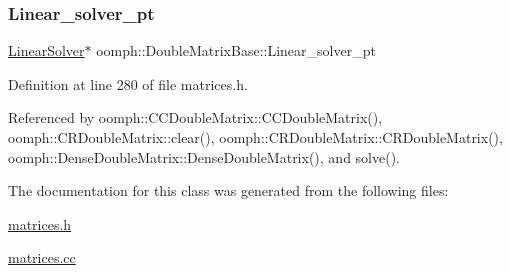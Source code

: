 \mbox{\label{classoomph_1_1DoubleMatrixBase_a86f0315e581cd5b41b75867383aa3760}} 
\subsubsection{\texorpdfstring{Linear\+\_\+solver\+\_\+pt}{Linear\_solver\_pt}}
{\footnotesize\ttfamily \hyperlink{classoomph_1_1LinearSolver}{Linear\+Solver}$\ast$ oomph\+::\+Double\+Matrix\+Base\+::\+Linear\+\_\+solver\+\_\+pt\hspace{0.3cm}{\ttfamily [protected]}}



Definition at line 280 of file matrices.\+h.



Referenced by oomph\+::\+C\+C\+Double\+Matrix\+::\+C\+C\+Double\+Matrix(), oomph\+::\+C\+R\+Double\+Matrix\+::clear(), oomph\+::\+C\+R\+Double\+Matrix\+::\+C\+R\+Double\+Matrix(), oomph\+::\+Dense\+Double\+Matrix\+::\+Dense\+Double\+Matrix(), and solve().



The documentation for this class was generated from the following files\+:\begin{DoxyCompactItemize}
\item 
\hyperlink{matrices_8h}{matrices.\+h}\item 
\hyperlink{matrices_8cc}{matrices.\+cc}\end{DoxyCompactItemize}

